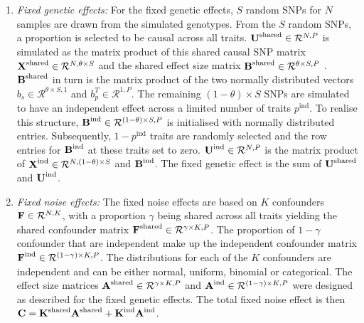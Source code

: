\begin{enumerate}
\item \textit{Fixed genetic effects:} For the fixed genetic effects, \(S\) random SNPs for \(N\) samples are drawn from the simulated genotypes. From the \(S\) random SNPs, a proportion \tbm{\theta} is selected to be causal across all traits. \(\boldsymbol{\mathbf{U}}^{\text{shared}} \in \mathcal{R}^{N,P}\) is simulated as the matrix product of this shared causal SNP matrix \(\boldsymbol{\mathbf{X}}^{\text{shared}} \in \mathcal{R}^{N,\theta  \times S}\) and the shared effect size matrix \(\boldsymbol{\mathbf{B}}^{\text{shared}} \in \mathcal{R}^{\theta  \times S, P}\) . \(\boldsymbol{\mathbf{B}}^{\text{shared}}\) in turn is the matrix product of the two normally distributed vectors \(b_s \in \mathcal{R}^{\theta  \times S,1}\) and \(b_p^T \in \mathcal{R}^{1,P}\). The remaining \((1- \theta ) \times S\) SNPs are simulated to have an independent effect across a limited number of traits \(p^{\text{ind}}\). To realise this structure, \(\boldsymbol{\mathbf{B}}^{\text{ind}}  \in \mathcal{R}^{(1-\theta)  \times S, P}\) is initialised with normally distributed entries. Subsequently, \(1 - p^{\text{ind}}\) traits are randomly selected and the row entries for \(\boldsymbol{\mathbf{B}}^{\text{ind}}\) at these traits set to zero. \(\boldsymbol{\mathbf{U}}^{\text{ind}} \in \mathcal{R}^{N,P}\) is the matrix product of  \(\boldsymbol{\mathbf{X}}^{\text{ind}} \in \mathcal{R}^{N,(1 - \theta)  \times S}\)  and \(\boldsymbol{\mathbf{B}}^{\text{ind}}\).
The fixed genetic effect  is the sum of \(\boldsymbol{\mathbf{U}}^{\text{shared}}\) and \(\boldsymbol{\mathbf{U}}^{\text{ind}}\).

\item \textit{Fixed noise effects:} The fixed noise effects  are based on \(K\)  confounders \(\boldsymbol{\mathbf{F}} \in \mathcal{R}^{N,K}\), with a proportion \(\gamma\) being shared across all traits yielding the shared confounder matrix \(\boldsymbol{\mathbf{F}}^{\text{shared}} \in \mathcal{R}^{\gamma \times K, P}\). The proportion of \(1- \gamma\) confounder that are independent make up the independent confounder matrix \(\boldsymbol{\mathbf{F}}^{\text{ind}} \in \mathcal{R}^{(1-\gamma)  \times K, P}\). The distributions for each of the \(K\)  confounders are independent and can be either normal, uniform, binomial or categorical.  The effect size matrices  \(\boldsymbol{\mathbf{A}}^{\text{shared}}  \in \mathcal{R}^{\gamma \times K, P}\)  and \(\boldsymbol{\mathbf{A}}^{\text{ind}}  \in \mathcal{R}^{(1-\gamma) \times K, P}\) were designed as described for the fixed genetic effects. The total fixed noise effect is then \(\boldsymbol{\mathbf{C}} = \boldsymbol{\mathbf{K}}^{\text{shared}}\boldsymbol{\mathbf{A}}^{\text{shared}} +  \boldsymbol{\mathbf{K}}^{\text{ind}}\boldsymbol{\mathbf{A}}^{\text{ind}}\).


\end{enumerate}
